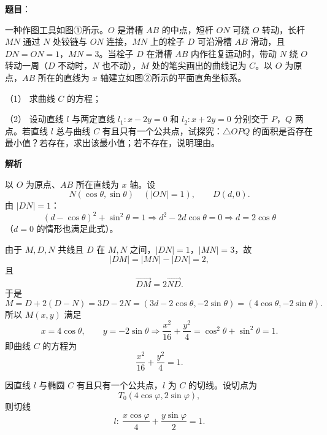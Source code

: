 \begin{answer}

\textbf{题目}：

一种作图工具如图①所示。\(O\) 是滑槽 \(AB\) 的中点，短杆 \(ON\) 可绕 \(O\) 转动，长杆 \(MN\) 通过 \(N\) 处铰链与 \(ON\) 连接，\(MN\) 上的栓子 \(D\) 可沿滑槽 \(AB\) 滑动，且 \(DN=ON=1\)，\(MN=3\)。当栓子 \(D\) 在滑槽 \(AB\) 内作往复运动时，带动 \(N\) 绕 \(O\) 转动一周（\(D\) 不动时，\(N\) 也不动），\(M\) 处的笔尖画出的曲线记为 \(C\)。以 \(O\) 为原点，\(AB\) 所在的直线为 \(x\) 轴建立如图②所示的平面直角坐标系。

（1） 求曲线 \(C\) 的方程；

（2） 设动直线 \(l\) 与两定直线 \(l_1:x-2y=0\) 和 \(l_2:x+2y=0\) 分别交于 \(P\)，\(Q\) 两点。若直线 \(l\) 总与曲线 \(C\) 有且只有一个公共点，试探究：\(\triangle OPQ\) 的面积是否存在最小值？若存在，求出该最小值；若不存在，说明理由。
\nopagebreak[4]
\begin{center}\end{center}
\nopagebreak[4]
\textbf{解析}


以 \(O\) 为原点、\(AB\) 所在直线为 \(x\) 轴。设
\nopagebreak[4]
\[
N(\cos\theta,\sin\theta)\quad(|ON|=1),\qquad D(d,0).
\]
由 \(|DN|=1\)：
\nopagebreak[4]
\[
(d-\cos\theta)^2+\sin^2\theta=1
\Longrightarrow
d^2-2d\cos\theta=0
\Longrightarrow
d=2\cos\theta
\]
（\(d=0\) 的情形也满足此式）。

由于 \(M,D,N\) 共线且 \(D\) 在 \(M,N\) 之间，\(|DN|=1\)，\(|MN|=3\)，故
\nopagebreak[4]
\[
|DM|=|MN|-|DN|=2,
\]
且
\nopagebreak[4]
\[
\overrightarrow{DM}=2\overrightarrow{ND}.
\]
于是
\nopagebreak[4]
\[
M=D+2(D-N)=3D-2N
=(3d-2\cos\theta,-2\sin\theta)
=(4\cos\theta,-2\sin\theta).
\]
所以 \(M(x,y)\) 满足
\nopagebreak[4]
\[
x=4\cos\theta,\qquad y=-2\sin\theta
\Longrightarrow
\dfrac{x^2}{16}+\dfrac{y^2}{4}=\cos^2\theta+\sin^2\theta=1.
\]
即曲线 \(C\) 的方程为
\nopagebreak[4]
\[
\dfrac{x^2}{16}+\dfrac{y^2}{4}=1.
\]


因直线 \(l\) 与椭圆 \(C\) 有且只有一个公共点，\(l\) 为 \(C\) 的切线。设切点为
\nopagebreak[4]
\[
T_0(4\cos\varphi,2\sin\varphi),
\]
则切线
\nopagebreak[4]
\[
l:\ \dfrac{x\cos\varphi}{4}+\dfrac{y\sin\varphi}{2}=1.
\]


\end{answer}
